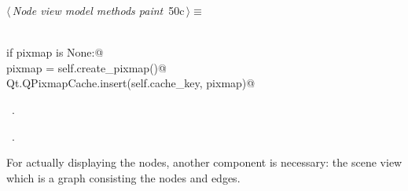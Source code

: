 \documentclass[
    a4paper,      %
    10pt,         %
    openright,    %
    notitlepage,  %
    parskip=half, %
]{scrreprt}       %
\theoremstyle{definition}                    %
\begin{document}
\begin{flushleft} \small
\begin{minipage}{\linewidth}\label{scrap71}\raggedright\small
{} $\langle\,${\itshape Node view model methods paint}\nobreak\ {\footnotesize {50c}}$\,\rangle\equiv$
\vspace{-1exm}
\begin{list}{}{} \item
\mbox{}\lstinline@@\\
\mbox{}\lstinline@    if pixmap is None:@\\
\mbox{}\lstinline@        pixmap = self.create_pixmap()@\\
\mbox{}\lstinline@        Qt.QPixmapCache.insert(self.cache_key, pixmap)@\\
\mbox{}\lstinline@@{\NWsep}
\end{list}
\vspace{-1.5ex}
\footnotesize
\begin{list}{}{\setlength{\itemsep}{-\parsep}\setlength{\itemindent}{-\leftmargin}}
\item \NWtxtMacroDefBy\ .
\item \NWtxtMacroRefIn\ .

\item{}
\end{list}
\end{minipage}\vspace{4ex}
\end{flushleft}
For actually displaying the nodes, another component is necessary: the scene
view which is a graph consisting the nodes and edges.
\end{document}
